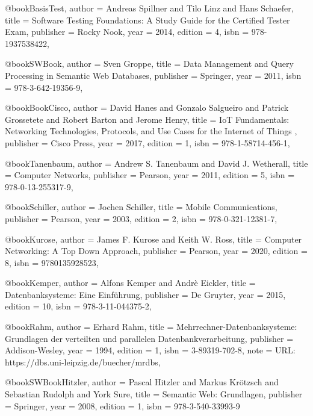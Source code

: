\documentclass[english,version-2019-11]{uzl-thesis}
\begin{document}
\begin{bibtex-entries}
@book{BasisTest,
    author    = {Andreas Spillner and Tilo Linz and Hans Schaefer}, 
    title     = {Software Testing Foundations: A Study Guide for the Certified Tester Exam},
    publisher = {Rocky Nook},
    year      = {2014},
    edition   = {4},
    isbn      = {978-1937538422},
}

@book{SWBook,
    author    = {Sven Groppe}, 
    title     = {Data Management and Query Processing in Semantic Web Databases},
    publisher = {Springer},
    year      = {2011},
    isbn      = {978-3-642-19356-9},
}

@book{BookCisco,
    author    = {David Hanes and Gonzalo Salgueiro and Patrick Grossetete and Robert Barton and Jerome Henry}, 
    title     = {IoT Fundamentals: Networking Technologies, Protocols, and Use Cases for the Internet of Things },
    publisher = {Cisco Press},
    year      = {2017},
    edition   = {1},
    isbn      = {978-1-58714-456-1},
}

@book{Tanenbaum,
    author    = {Andrew S. Tanenbaum and David J. Wetherall}, 
    title     = {Computer Networks},
    publisher = {Pearson},
    year      = {2011},
    edition   = {5},
    isbn      = {978-0-13-255317-9},
}

@book{Schiller,
    author    = {Jochen Schiller}, 
    title     = {Mobile Communications},
    publisher = {Pearson},
    year      = {2003},
    edition   = {2},
    isbn      = {978-0-321-12381-7},
}

@book{Kurose,
    author    = {James F. Kurose and Keith W. Ross}, 
    title     = {Computer Networking: A Top Down Approach},
    publisher = {Pearson},
    year      = {2020},
    edition   = {8},
    isbn      = {9780135928523},
}

@book{Kemper,
    author    = {Alfons Kemper and Andr\`{e} Eickler}, 
    title     = {Datenbanksysteme: Eine Einf{\"u}hrung},
    publisher = {De Gruyter},
    year      = {2015},
    edition   = {10},
    isbn      = {978-3-11-044375-2},
}

@book{Rahm,
    author    = {Erhard Rahm}, 
    title     = {Mehrrechner-Datenbanksysteme: Grundlagen der verteilten und parallelen Datenbankverarbeitung},
    publisher = {Addison-Wesley},
    year      = {1994},
    edition   = {1},
    isbn      = {3-89319-702-8},
    note      = {URL: https://dbs.uni-leipzig.de/buecher/mrdbs},
}

@book{SWBookHitzler,
    author    = {Pascal Hitzler and Markus Kr{\"o}tzsch and Sebastian Rudolph and York Sure}, 
    title     = {Semantic Web: Grundlagen},
    publisher = {Springer},
    year      = {2008},
    edition   = {1},
    isbn      = {978-3-540-33993-9}
}




\end{bibtex-entries}
\end{document}
